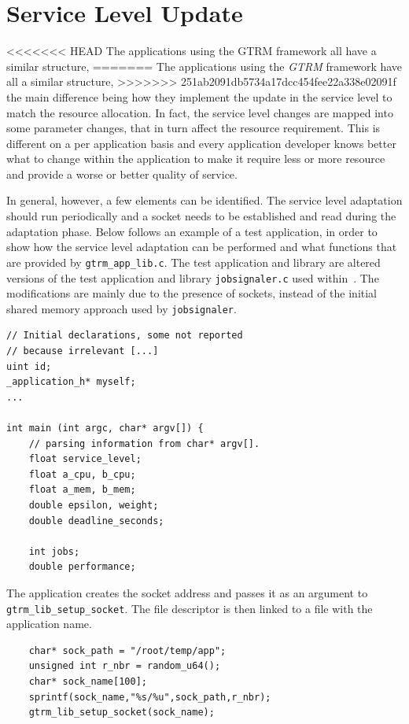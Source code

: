 \documentclass[nobiblatex]{LTHthesis}
\begin{document}
\section{Service Level Update}
\label{sec:servicelevelupdatesection}

<<<<<<< HEAD
The applications using the GTRM framework all have a similar structure,
=======
The applications using the \emph{GTRM} framework have all a similar structure,
>>>>>>> 251ab2091db5734a17dcc454fee22a338e02091f
the main difference being how they implement the update in the service
level to match the resource allocation. In fact, the service level changes
are mapped into some parameter changes, that in turn affect the resource
requirement. This is different on a per application basis and every
application developer knows better what to change within the application
to make it require less or more resource and provide a worse or better
quality of service.

In general, however, a few elements can be identified. The service level
adaptation should run periodically and a socket needs to be established
and read during the adaptation phase. Below follows an example of a test application, in order
to show how the service level adaptation can be performed
and what functions that are provided by \texttt{gtrm\_app\_lib.c}.
The test application and library are altered versions of the test 
application and library \texttt{jobsignaler.c} used within~\cite{gtrm}.
The modifications are mainly due to the presence of sockets, instead of
the initial shared memory approach used by \texttt{jobsignaler}.

\begin{lstlisting}
// Initial declarations, some not reported
// because irrelevant [...]
uint id;
_application_h* myself;
...	

int main (int argc, char* argv[]) {
	// parsing information from char* argv[].
	float service_level;
	float a_cpu, b_cpu;
	float a_mem, b_mem;
	double epsilon, weight;
	double deadline_seconds;
	
	int jobs;
	double performance;
\end{lstlisting}

The application creates the socket address and passes it as an argument to 
\texttt{gtrm\_lib\_setup\_socket}. The file descriptor is then linked to
a file with the application name.
\begin{lstlisting}
	char* sock_path = "/root/temp/app";
	unsigned int r_nbr = random_u64();
	char* sock_name[100];
	sprintf(sock_name,"%s/%u",sock_path,r_nbr);
	gtrm_lib_setup_socket(sock_name);
\end{lstlisting}
\end{document}
